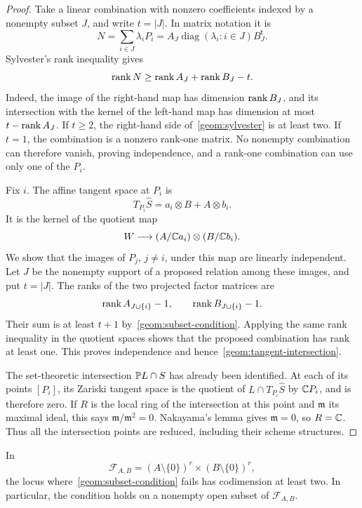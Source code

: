 \begin{proof}
Take a linear combination with nonzero coefficients indexed by a
nonempty subset $J$, and write $t=|J|$. In matrix notation it is
\[
 N=\sum_{i\in J}\lambda_i P_i
   =A_J\operatorname{diag}(\lambda_i:i\in J)B_J^{\mathsf t}.
\]
Sylvester's rank inequality gives
\begin{equation}\label{geom:sylvester}
 \operatorname{rank} N\geq\operatorname{rank} A_J+\operatorname{rank} B_J-t.
\end{equation}
Indeed, the image of the right-hand map has dimension $\operatorname{rank} B_J$,
and its intersection with the kernel of the left-hand map has
dimension at most $t-\operatorname{rank} A_J$. If $t\geq2$, the right-hand side
of~\eqref{geom:sylvester} is at least two. If $t=1$, the combination
is a nonzero rank-one matrix. No nonempty combination can therefore
vanish, proving independence, and a rank-one combination can use only
one of the $P_i$.

Fix $i$. The affine tangent space at $P_i$ is
\[
 T_{P_i}\widehat S=a_i\otimes B+A\otimes b_i.
\]
It is the kernel of the quotient map
\[
 W\longrightarrow (A/\mathbb C a_i)\otimes(B/\mathbb C b_i).
\]
We show that the images of $P_j$, $j\neq i$, under this map are
linearly independent. Let $J$ be the nonempty support of a proposed
relation among these images, and put $t=|J|$. The ranks of the two
projected factor matrices are
\[
 \operatorname{rank} A_{J\cup\{i\}}-1,
 \qquad
 \operatorname{rank} B_{J\cup\{i\}}-1.
\]
Their sum is at least $t+1$ by~\eqref{geom:subset-condition}.
Applying the same rank inequality in the quotient spaces shows that
the proposed combination has rank at least one. This proves
independence and hence~\eqref{geom:tangent-intersection}.

The set-theoretic intersection $\mathbb P L\cap S$ has already been
identified. At each of its points $[P_i]$, its Zariski tangent space
is the quotient of $L\cap T_{P_i}\widehat S$ by $\mathbb C P_i$, and is
therefore zero. If $R$ is the local ring of the intersection at this
point and $\mathfrak m$ its maximal ideal, this says
$\mathfrak m/\mathfrak m^2=0$. Nakayama's lemma gives
$\mathfrak m=0$, so $R=\mathbb C$. Thus all the intersection points are
reduced, including their scheme structures.
\end{proof}

\begin{lemma}\label{geom:bad-pairs-codimension}
In
\[
 \mathcal F_{A,B}=(A\setminus\{0\})^r
                    \times(B\setminus\{0\})^r,
\]
the locus where~\eqref{geom:subset-condition} fails has codimension
at least two. In particular, the condition holds on a nonempty open
subset of $\mathcal F_{A,B}$.
\end{lemma}

